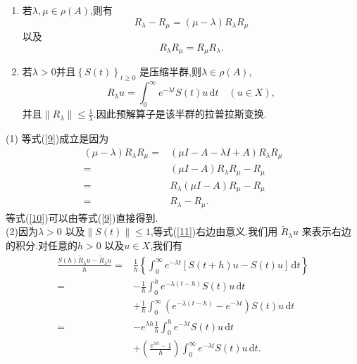   \begin{theorem}
  	\begin{enumerate}
   	 \item 若$\lambda,\mu \in \rho(A)$,则有
     	 \begin{equation}
	   R_\lambda-R_\mu=\left( \mu-\lambda \right) R_\lambda R_\mu\label{9}
     	 \end{equation}以及
     	 \begin{equation}
	   R_\lambda R_\mu=R_\mu R_\lambda.\label{10}
     	 \end{equation}
  	 \item 若$\lambda>0$并且$\left\{S(t)\right\} _{t\ge 0}$ 是压缩半群,则$\lambda \in \rho (A)$,
     	 \begin{equation}
	   R_\lambda u = \int_0^{\infty}e^{-\lambda t}S(t)u\,\mathrm{d}t \quad (u\in X),\label{11}
     	 \end{equation}
      并且$\|R_\lambda\|\le \frac{1}{\lambda}$.因此预解算子是该半群的拉普拉斯变换.
 	 \end{enumerate}
	\end{theorem}
  (1) 等式(\ref{9})成立是因为
  \begin{align*}
    (\mu-\lambda)R_\lambda R_\mu = & \left( \mu I-A-\lambda I +A \right) R_\lambda R_\mu\\
    = & \left( \mu I-A \right) R_\lambda R_\mu -R_\mu\\
    =& R_\lambda (\mu I-A) R_\mu -R_\mu\\
    =& R_\lambda -R_\mu
  .\end{align*}
  等式(\ref{10})可以由等式(\ref{9})直接得到.\\
  (2)因为$\lambda>0$ 以及$\|S(t)\|\le 1$,等式(\ref{11})右边由意义.我们用 $\widetilde{R}_\lambda u$ 来表示右边的积分.对任意的$h>0$ 以及$u \in X$,我们有
  \begin{align*}
    \frac{S(h)\widetilde{R}_\lambda u-\widetilde{R}_\lambda u}{h}=& \frac{1}{h}\left\{ \int_0^{\infty}e^{-\lambda t}[S(t+h)u-S(t)u]\,\mathrm{d}t\right\} \\
    =& -\frac{1}{h}\int_0^{h}e^{-\lambda(t-h)}S(t)u\,\mathrm{d}t\\
    &+ \frac{1}{h}\int_0^{\infty}(e^{-\lambda(t-h)}-e^{-\lambda t})S(t)u\,\mathrm{d}t\\
    = & -e^{\lambda h}\frac{1}{h}\int_0^{h}e^{-\lambda t }S(t)u\,\mathrm{d}t\\
    &+\left( \frac{e^{\lambda h}-1}{h} \right) \int_0^{\infty}e^{-\lambda t}S(t)u\,\mathrm{d}t
  .\end{align*}
